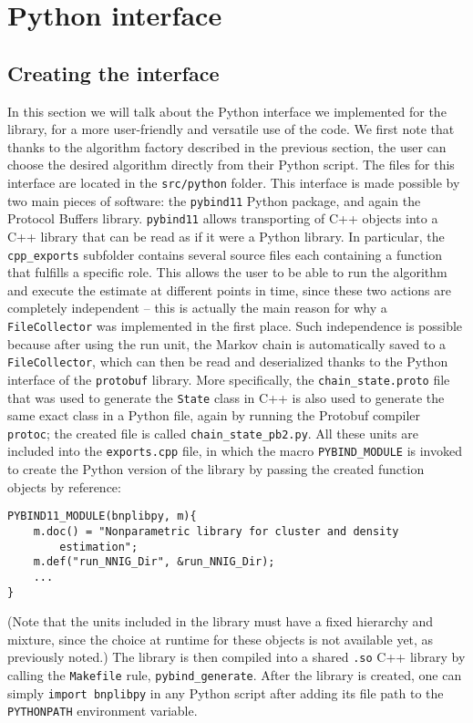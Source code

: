 \chapter{Python interface} \label{chap-py-int}

\section{Creating the interface}
In this section we will talk about the Python interface we implemented for the library, for a more user-friendly and versatile use of the code.
We first note that thanks to the algorithm factory described in the previous section, the user can choose the desired algorithm directly from their Python script.
The files for this interface are located in the \verb|src/python| folder.
This interface is made possible by two main pieces of software: the \verb|pybind11| Python package, and again the Protocol Buffers library.
\verb|pybind11| allows transporting of C++ objects into a C++ library that can be read as if it were a Python library.
In particular, the \verb|cpp_exports| subfolder contains several source files each containing a function that fulfills a specific role.
This allows the user to be able to run the algorithm and execute the estimate at different points in time, since these two actions are completely independent -- this is actually the main reason for why a \verb|FileCollector| was implemented in the first place.
Such independence is possible because after using the run unit, the Markov chain is automatically saved to a \verb|FileCollector|, which can then be read and deserialized thanks to the Python interface of the \verb|protobuf| library.
More specifically, the \verb|chain_state.proto| file that was used to generate the \verb|State| class in C++ is also used to generate the same exact class in a Python file, again by running the Protobuf compiler \verb|protoc|; the created file is called \verb|chain_state_pb2.py|.
All these units are included into the \verb|exports.cpp| file, in which the macro \verb|PYBIND_MODULE| is invoked to create the Python version of the library by passing the created function objects by reference:
\begin{verbatim}
PYBIND11_MODULE(bnplibpy, m){
    m.doc() = "Nonparametric library for cluster and density
        estimation";
    m.def("run_NNIG_Dir", &run_NNIG_Dir);
    ...
}
\end{verbatim}
(Note that the units included in the library must have a fixed hierarchy and mixture, since the choice at runtime for these objects is not available yet, as previously noted.)
The library is then compiled into a shared \verb|.so| C++ library by calling the \verb|Makefile| rule, \verb|pybind_generate|.
After the library is created, one can simply \verb|import bnplibpy| in any Python script after adding its file path to the \verb|PYTHONPATH| environment variable.

